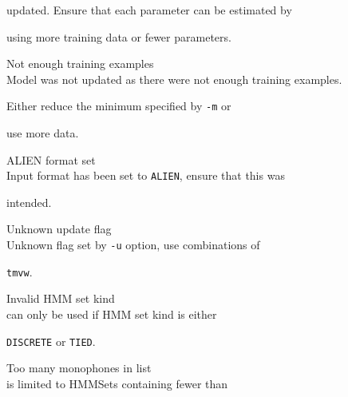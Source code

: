 \begin{itemize}
\begin{itemize}
        updated.  Ensure that each parameter can be estimated by


        using more training data or fewer parameters.





    Not enough training examples\\


        Model was not updated as there were not enough training examples.


        Either reduce the minimum specified by \texttt{-m} or


        use more data.





    ALIEN format set\\


        Input format has been set to \texttt{ALIEN}, ensure that this was 


        intended.





\end{itemize}










\begin{itemize}


    Unknown update flag\\


        Unknown flag set by \texttt{-u} option, use combinations of 


        \texttt{tmvw}.





    Invalid HMM set kind\\


         can only be used if HMM set kind is either


        \texttt{DISCRETE} or \texttt{TIED}.





    Too many monophones in list\\


         is limited to HMMSets containing fewer than



\end{itemize}
\end{itemize}
